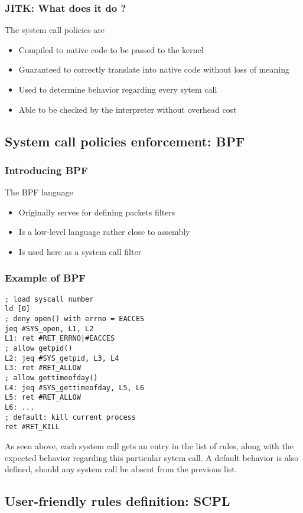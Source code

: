 \documentclass{beamer}
\begin{document}
\begin{frame}\frametitle{JITK: What does it do ?}
The system call policies are
\begin{itemize}[<+->]
	\item Compiled to native code to be passed to the kernel
	\item Guaranteed to correctly translate into native code without loss of meaning
	\item Used to determine behavior regarding every sytem call
	\item Able to be checked by the interpreter without overhead cost
 \end{itemize}
\end{frame}

\subsection{System call policies enforcement: BPF}
\begin{frame}\frametitle{Introducing BPF}
The BPF language
\begin{itemize}[<+->]
	\item Originally serves for defining packets filters
	\item Is a low-level language rather close to assembly
	\item Is used here as a system call filter
 \end{itemize}
\end{frame}

\begin{frame}\frametitle{Example of BPF}
\begin{verbatim}
; load syscall number
ld [0]
; deny open() with errno = EACCES
jeq #SYS_open, L1, L2
L1: ret #RET_ERRNO|#EACCES
; allow getpid()
L2: jeq #SYS_getpid, L3, L4
L3: ret #RET_ALLOW
; allow gettimeofday()
L4: jeq #SYS_gettimeofday, L5, L6
L5: ret #RET_ALLOW
L6: ...
; default: kill current process
ret #RET_KILL
\end{verbatim}
\pause
As seen above, each system call gets an entry in the list of rules, along with the expected behavior regarding this particular sytem call. A default behavior is also defined, should any system call be absent from the previous list.
\end{frame}

\subsection{User-friendly rules definition: SCPL}
\end{document}
